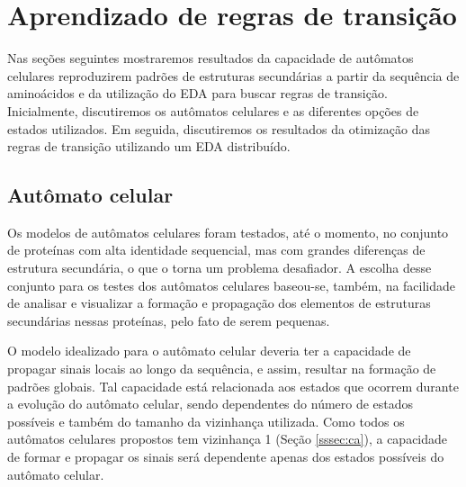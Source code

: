 \chapter{Aprendizado de regras de transição}

Nas seções seguintes mostraremos resultados da capacidade de autômatos celulares reproduzirem padrões de estruturas secundárias a partir da sequência de aminoácidos e da utilização do EDA para buscar regras de transição. Inicialmente, discutiremos os autômatos celulares e as diferentes opções de estados utilizados. Em seguida, discutiremos os resultados da otimização das regras de transição utilizando um EDA distribuído.  


\section{Autômato celular}

Os modelos de autômatos celulares foram testados, até o momento, no conjunto de proteínas com alta identidade sequencial, mas com grandes diferenças de estrutura secundária, o que o torna um problema desafiador. A escolha desse conjunto para os testes dos autômatos celulares baseou-se, também, na facilidade de analisar e visualizar a formação e propagação dos elementos de estruturas secundárias nessas proteínas, pelo fato de serem pequenas.


O modelo idealizado para o autômato celular deveria ter a capacidade de propagar sinais locais ao longo da sequência, e assim, resultar na formação de padrões globais. Tal capacidade está relacionada aos estados que ocorrem durante a evolução do autômato celular, sendo dependentes do número de estados possíveis e também do tamanho da vizinhança utilizada. Como todos os autômatos celulares propostos tem vizinhança 1 (Seção \ref{sssec:ca}), a capacidade de formar e propagar os sinais será dependente apenas dos estados possíveis do autômato celular.

